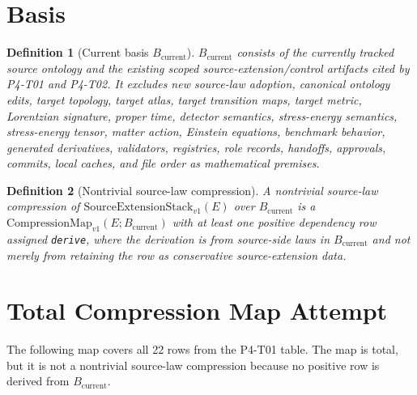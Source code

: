 \documentclass[11pt]{article}
\newcommand{\Stack}{\mathrm{SourceExtensionStack}_{v1}}
\newcommand{\CompMap}{\mathrm{CompressionMap}_{v1}}
\newcommand{\Bcur}{B_{\mathrm{current}}}
\newtheorem{definition}{Definition}
\begin{document}
\section{Basis}

\begin{definition}[Current basis \(\Bcur\)]
\(\Bcur\) consists of the currently tracked source ontology and the existing
scoped source-extension/control artifacts cited by P4-T01 and P4-T02. It
excludes new source-law adoption, canonical ontology edits, target topology,
target atlas, target transition maps, target metric, Lorentzian signature,
proper time, detector semantics, stress-energy semantics, stress-energy
tensor, matter action, Einstein equations, benchmark behavior, generated
derivatives, validators, registries, role records, handoffs, approvals,
commits, local caches, and file order as mathematical premises.
\end{definition}

\begin{definition}[Nontrivial source-law compression]
A nontrivial source-law compression of \(\Stack(E)\) over \(\Bcur\) is a
\(\CompMap(E;\Bcur)\) with at least one positive dependency row assigned
\texttt{derive}, where the derivation is from source-side laws in \(\Bcur\)
and not merely from retaining the row as conservative source-extension data.
\end{definition}

\section{Total Compression Map Attempt}

The following map covers all 22 rows from the P4-T01 table. The map is total,
but it is not a nontrivial source-law compression because no positive row is
derived from \(\Bcur\).
\end{document}
